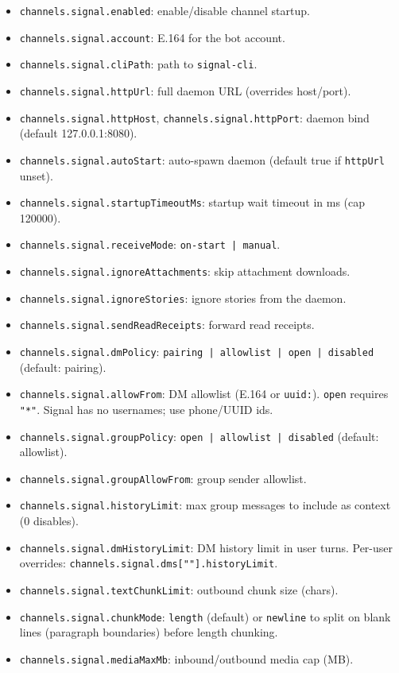 \begin{itemize}
  \item \texttt{channels.signal.enabled}: enable/disable channel startup.
  \item \texttt{channels.signal.account}: E.164 for the bot account.
  \item \texttt{channels.signal.cliPath}: path to \texttt{signal-cli}.
  \item \texttt{channels.signal.httpUrl}: full daemon URL (overrides host/port).
  \item \texttt{channels.signal.httpHost}, \texttt{channels.signal.httpPort}: daemon bind (default 127.0.0.1:8080).
  \item \texttt{channels.signal.autoStart}: auto-spawn daemon (default true if \texttt{httpUrl} unset).
  \item \texttt{channels.signal.startupTimeoutMs}: startup wait timeout in ms (cap 120000).
  \item \texttt{channels.signal.receiveMode}: \texttt{on-start | manual}.
  \item \texttt{channels.signal.ignoreAttachments}: skip attachment downloads.
  \item \texttt{channels.signal.ignoreStories}: ignore stories from the daemon.
  \item \texttt{channels.signal.sendReadReceipts}: forward read receipts.
  \item \texttt{channels.signal.dmPolicy}: \texttt{pairing | allowlist | open | disabled} (default: pairing).
  \item \texttt{channels.signal.allowFrom}: DM allowlist (E.164 or \texttt{uuid:}). \texttt{open} requires \texttt{"*"}. Signal has no usernames; use phone/UUID ids.
  \item \texttt{channels.signal.groupPolicy}: \texttt{open | allowlist | disabled} (default: allowlist).
  \item \texttt{channels.signal.groupAllowFrom}: group sender allowlist.
  \item \texttt{channels.signal.historyLimit}: max group messages to include as context (0 disables).
  \item \texttt{channels.signal.dmHistoryLimit}: DM history limit in user turns. Per-user overrides: \texttt{channels.signal.dms[""].historyLimit}.
  \item \texttt{channels.signal.textChunkLimit}: outbound chunk size (chars).
  \item \texttt{channels.signal.chunkMode}: \texttt{length} (default) or \texttt{newline} to split on blank lines (paragraph boundaries) before length chunking.
  \item \texttt{channels.signal.mediaMaxMb}: inbound/outbound media cap (MB).
\end{itemize}


